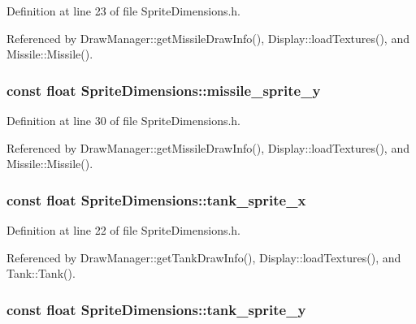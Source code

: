 Definition at line 23 of file Sprite\-Dimensions.\-h.



Referenced by Draw\-Manager\-::get\-Missile\-Draw\-Info(), Display\-::load\-Textures(), and Missile\-::\-Missile().

\hypertarget{classSpriteDimensions_adcf501d11ae383d24cbbe5b526585f86}{
\subsubsection[{missile\-\_\-sprite\-\_\-y}]{\setlength{\rightskip}{0pt plus 5cm}const float Sprite\-Dimensions\-::missile\-\_\-sprite\-\_\-y}}\label{classSpriteDimensions_adcf501d11ae383d24cbbe5b526585f86}


Definition at line 30 of file Sprite\-Dimensions.\-h.



Referenced by Draw\-Manager\-::get\-Missile\-Draw\-Info(), Display\-::load\-Textures(), and Missile\-::\-Missile().

\hypertarget{classSpriteDimensions_a9d7ddd6f707798f86ced573e28f9eea0}{
\subsubsection[{tank\-\_\-sprite\-\_\-x}]{\setlength{\rightskip}{0pt plus 5cm}const float Sprite\-Dimensions\-::tank\-\_\-sprite\-\_\-x}}\label{classSpriteDimensions_a9d7ddd6f707798f86ced573e28f9eea0}


Definition at line 22 of file Sprite\-Dimensions.\-h.



Referenced by Draw\-Manager\-::get\-Tank\-Draw\-Info(), Display\-::load\-Textures(), and Tank\-::\-Tank().

\hypertarget{classSpriteDimensions_abe1930e59ce44b9bdc0e6b363b668f7d}{
\subsubsection[{tank\-\_\-sprite\-\_\-y}]{\setlength{\rightskip}{0pt plus 5cm}const float Sprite\-Dimensions\-::tank\-\_\-sprite\-\_\-y}}\label{classSpriteDimensions_abe1930e59ce44b9bdc0e6b363b668f7d}



